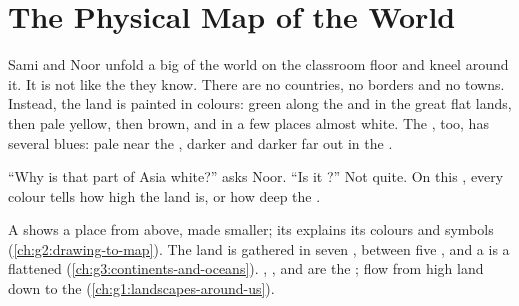 \chapter{The Physical Map of the World}\label{ch:g4:world-physical-map}

Sami and Noor unfold a big  of the world on the classroom floor and
kneel around it. It is not like the  they know. There are no
countries, no borders and no towns. Instead, the land is painted in
colours: green along the  and in the great flat lands, then pale
yellow, then brown, and in a few places almost white. The , too, has
several blues: pale near the , darker and darker far out in the
.

``Why is that part of Asia white?'' asks Noor. ``Is it ?'' Not quite.
On this , every colour tells how high the land is, or how deep the .

\begin{recall}
A  shows a place from above, made smaller; its  explains its
colours and symbols (\cref{ch:g2:drawing-to-map}). The land is gathered in
seven , between five , and a  is a flattened 
(\cref{ch:g3:continents-and-oceans}). , ,  and 
are the ;  flow from high land down to the 
(\cref{ch:g1:landscapes-around-us}).
\end{recall}

